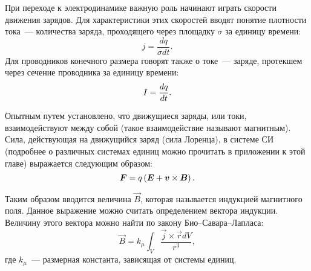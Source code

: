 При переходе к электродинамике важную роль начинают играть скорости движения
зарядов. Для характеристики этих скоростей вводят понятие плотности тока~---
количества заряда, проходящего через площадку $\sigma$ за единицу времени:
\begin{equation}
	j = \frac{dq}{\sigma dt}.
\end{equation}
Для проводников конечного размера говорят также о токе~--- заряде, протекшем
через сечение проводника за единицу времени:
\begin{equation}
	\eqmark{current}
	I = \frac{dq}{dt}.
\end{equation}

Опытным путем установлено, что движущиеся заряды, или токи, взаимодействуют
между собой (такое взаимодействие называют магнитным). Сила, действующая на
движущийся заряд (сила Лоренца), в системе СИ (подробнее о различных системах единиц можно прочитать в приложении к этой главе) выражается следующим образом:
\begin{equation}
	\eqmark{lorentz}
	\vec{F} = q \left( \vec{E} + \vec{v} \times \vec{B} \right).
\end{equation}


Таким образом вводится величина $\vec{B}$, которая называется индукцией
магнитного поля. Данное выражение можно считать определением вектора индукции.
Величину этого вектора можно найти по закону Био--Савара--Лапласа:
\begin{equation}
	\vec{B} = k_{\mu}\int_{V}{\frac{\vec{j} \times \vec{r} dV}{r^3}},
\end{equation}
где $k_{\mu}$~--- размерная константа, зависящая от системы единиц.


